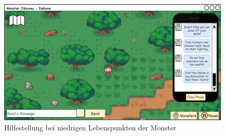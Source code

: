 \begin{figure}[H]
        \center
        \includegraphics[scale=\scale]{images/mockups/Bonusfeatures/Helpsituation/PlayerAndPlayerIngameEigthNotification.png}
        \caption{Hilfestellung bei niedrigen Lebenspunkten der Monster}
        \label{fig: Achte Nachricht}
\end{figure}
